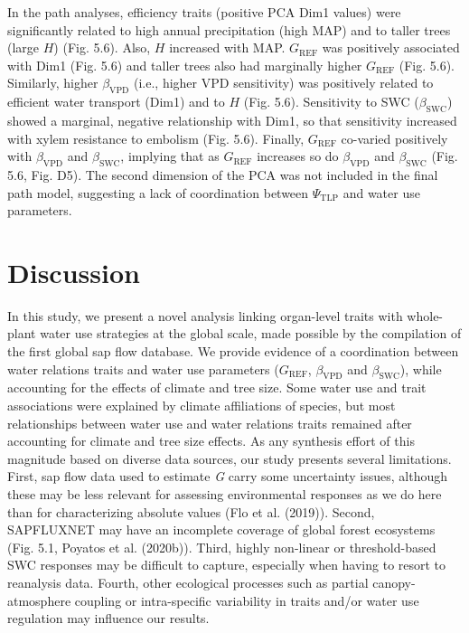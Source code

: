 \documentclass[11pt,twoside]{reedthesis}
\begin{document}
In the path analyses, efficiency traits (positive PCA Dim1 values) were
significantly related to high annual precipitation (high MAP) and to
taller trees (large \(H\)) (Fig. 5.6). Also, \(H\) increased with MAP.
\(G_{\text{REF}}\) was positively associated with Dim1 (Fig. 5.6) and
taller trees also had marginally higher \(G_{\text{REF}}\) (Fig. 5.6).
Similarly, higher \(\beta_{\text{VPD}}\) (i.e., higher VPD sensitivity)
was positively related to efficient water transport (Dim1) and to \(H\)
(Fig. 5.6). Sensitivity to SWC (\(\beta_{\text{SWC}}\)) showed a
marginal, negative relationship with Dim1, so that sensitivity increased
with xylem resistance to embolism (Fig. 5.6). Finally,
\(G_{\text{REF}}\) co-varied positively with \(\beta_{\text{VPD}}\) and
\(\beta_{\text{SWC}}\), implying that as \(G_{\text{REF}}\) increases so
do \(\beta_{\text{VPD}}\) and \(\beta_{\text{SWC}}\) (Fig. 5.6, Fig.
D5). The second dimension of the PCA was not included in the final path
model, suggesting a lack of coordination between \(\Psi_{\text{TLP}}\)
and water use parameters.\par

\section{Discussion}\label{discussion}

In this study, we present a novel analysis linking organ-level traits
with whole-plant water use strategies at the global scale, made possible
by the compilation of the first global sap flow database. We provide
evidence of a coordination between water relations traits and water use
parameters (\(G_{\text{REF}}\), \(\beta_{\text{VPD}}\) and
\(\beta_{\text{SWC}}\)), while accounting for the effects of climate and
tree size. Some water use and trait associations were explained by
climate affiliations of species, but most relationships between water
use and water relations traits remained after accounting for climate and
tree size effects. As any synthesis effort of this magnitude based on
diverse data sources, our study presents several limitations. First, sap
flow data used to estimate \emph{G} carry some uncertainty issues,
although these may be less relevant for assessing environmental
responses as we do here than for characterizing absolute values (Flo et
al. (2019)). Second, SAPFLUXNET may have an incomplete coverage of
global forest ecosystems (Fig. 5.1, Poyatos et al. (2020b)). Third,
highly non-linear or threshold-based SWC responses may be difficult to
capture, especially when having to resort to reanalysis data. Fourth,
other ecological processes such as partial canopy-atmosphere coupling or
intra-specific variability in traits and/or water use regulation may
influence our results.\par
\end{document}
